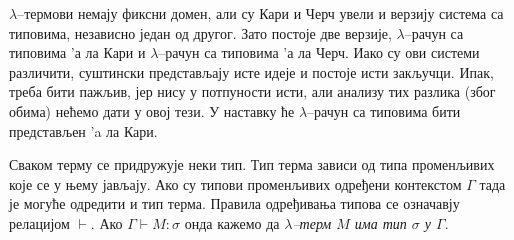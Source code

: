 $\lambda$--термови немају фиксни домен, али су Кари
\cite{curry1934functionality} и Черч \cite{church1940formulation}
увели и верзију система са типовима, независно један од другог. Зато
постоје две верзије, $\lambda$--рачун са типовима 'а ла Кари и
$\lambda$--рачун са типовима 'а ла Черч. Иако су ови системи
различити, суштински представљају исте идеје и постоје исти
закључци. Ипак, треба бити пажљив, јер нису у потпуности исти, али
анализу тих разлика (због обима) нећемо дати у овој тези. У наставку
ће $\lambda$--рачун са типовима бити представљен 'a ла Кари.

Сваком терму се придружује неки тип. Тип терма зависи од типа
променљивих које се у њему јављају. Ако су типови променљивих одређени
контекстом $\Gamma$ тада је могуће одредити и тип терма. Правила
одређивања типова се означавју релацијом $\vdash$. Ако $\Gamma \vdash
M : \sigma$ онда кажемо да \emph{$\lambda$--терм $M$ има тип $\sigma$
  у $\Gamma$}.

